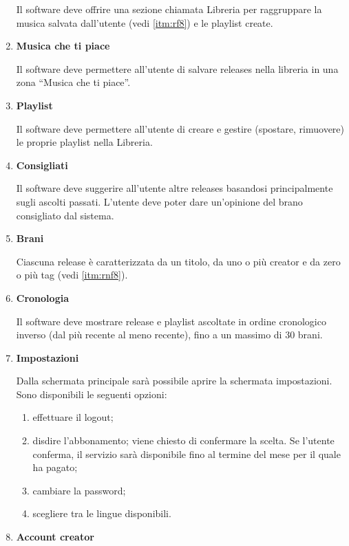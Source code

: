 \documentclass[a4paper,12pt]{article}
\begin{document}
\begin{enumerate}[label=\textbf{RF\arabic*}\;, ref=\textbf{RF\arabic*}]
    Il software deve offrire una sezione chiamata Libreria per raggruppare la musica salvata dall’utente (vedi \ref{itm:rf8}) e le playlist create.

    \item \label{itm:rf8} \textbf{Musica che ti piace}
    
    Il software deve permettere all’utente di salvare releases nella libreria in una zona “Musica che ti piace”.
    \item \label{itm:rf9} \textbf{Playlist}
    
    Il software deve permettere all’utente di creare e gestire (spostare, rimuovere) le proprie playlist nella Libreria.
    \item \label{itm:rf10} \textbf{Consigliati}
    
    Il software deve suggerire all’utente altre releases basandosi principalmente sugli ascolti passati. L’utente deve poter dare un’opinione del brano consigliato dal sistema.
    \item \label{itm:rf11} \textbf{Brani}
    
    Ciascuna release è caratterizzata da un titolo, da uno o più creator e da zero o più tag (vedi \ref{itm:rnf8}).
    \item \label{itm:rf12} \textbf{Cronologia}
    
    Il software deve mostrare release e playlist ascoltate in ordine cronologico inverso (dal più recente al meno recente), fino a un massimo di 30 brani.
    \item \label{itm:rf13} \textbf{Impostazioni}
    
    Dalla schermata principale sarà possibile aprire la schermata impostazioni. Sono disponibili le seguenti opzioni:
    \begin{enumerate}[label=\textbf{\alph*}, ref=\textbf{RF13\alph*}, itemsep=0.5em]
        \item \label{itm:rf13a} effettuare il logout;
        \item \label{itm:rf13b} disdire l’abbonamento; viene chiesto di confermare la scelta. Se l’utente conferma, il servizio sarà disponibile fino al termine del mese per il quale ha pagato;
        \item \label{itm:rf13c} cambiare la password; 
        \item \label{itm:rf13d} scegliere tra le lingue disponibili.   
    \end{enumerate}
    \item \label{itm:rf14} \textbf{Account creator}
    

\end{enumerate}
\end{document}
